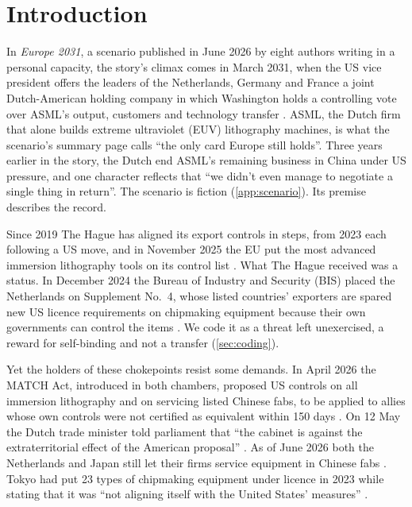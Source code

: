\section{Introduction}\label{sec:intro}

In \emph{Europe 2031}, a scenario published in June 2026 by eight authors writing in a personal capacity, the story's climax comes in March 2031, when the US vice president offers the leaders of the Netherlands, Germany and France a joint Dutch-American holding company in which Washington holds a controlling vote over ASML's output, customers and technology transfer \citep{juijn2026europe}. ASML, the Dutch firm that alone builds extreme ultraviolet (EUV) lithography machines, is what the scenario's summary page calls ``the only card Europe still holds''. Three years earlier in the story, the Dutch end ASML's remaining business in China under US pressure, and one character reflects that ``we didn't even manage to negotiate a single thing in return''. The scenario is fiction (\cref{app:scenario}). Its premise describes the record.

Since 2019 The Hague has aligned its export controls in steps, from 2023 each following a US move, and in November 2025 the EU put the most advanced immersion lithography tools on its control list \citep{eu2025dualuse}. What The Hague received was a status. In December 2024 the Bureau of Industry and Security (BIS) placed the Netherlands on Supplement No.~4, whose listed countries' exporters are spared new US licence requirements on chipmaking equipment because their own governments can control the items \citep{bis2024fdpr}. We code it as a threat left unexercised, a reward for self-binding and not a transfer (\cref{sec:coding}).

Yet the holders of these chokepoints resist some demands. In April 2026 the MATCH Act, introduced in both chambers, proposed US controls on all immersion lithography and on servicing listed Chinese fabs, to be applied to allies whose own controls were not certified as equivalent within 150 days \citep{hr8170, s4281}. On 12 May the Dutch trade minister told parliament that ``the cabinet is against the extraterritorial effect of the American proposal'' \citep[our translation]{tk2026match}. As of June 2026 both the Netherlands and Japan still let their firms service equipment in Chinese fabs \citep{zakaria2026match}. Tokyo had put 23 types of chipmaking equipment under licence in 2023 while stating that it was ``not aligning itself with the United States' measures'' \citep{allen2023translation, hoganlovells2023japan}.

